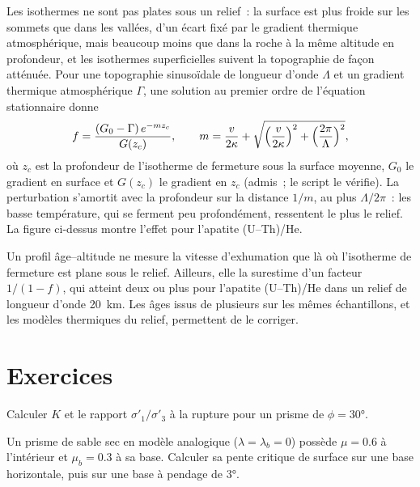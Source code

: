Les isothermes ne sont pas plates sous un relief~: la surface est plus froide sur les sommets
que dans les vallées, d'un écart fixé par le gradient thermique atmosphérique, mais beaucoup moins que
dans la roche à la même altitude en profondeur, et les isothermes superficielles
suivent la topographie de façon atténuée. Pour une topographie sinusoïdale de
longueur d'onde $\Lambda$ et un gradient thermique atmosphérique $\Gamma$, une solution au premier ordre de l'équation
stationnaire donne
\[
  f = \frac{(G_0 - \Gamma)\,e^{-mz_c}}{G(z_c)},\qquad
  m = \frac{v}{2\kappa} + \sqrt{\Bigl(\frac{v}{2\kappa}\Bigr)^2 +
  \Bigl(\frac{2\pi}{\Lambda}\Bigr)^2},
\]
où $z_c$ est la profondeur de l'isotherme de fermeture sous la surface moyenne,
$G_0$ le gradient en surface et $G(z_c)$ le gradient en $z_c$ (admis~;
le script le vérifie). La perturbation s'amortit avec la profondeur sur
la distance $1/m$, au plus $\Lambda/2\pi$~: les  basse température,
qui se ferment peu profondément, ressentent le plus le relief. La figure ci-dessus montre l'effet
pour l'apatite (U--Th)/He.

Un profil âge--altitude ne mesure la vitesse d'exhumation que là où
l'isotherme de fermeture est plane sous le relief. Ailleurs, elle la surestime d'un facteur $1/(1 - f)$, qui atteint
deux ou plus pour l'apatite (U--Th)/He dans un relief de longueur d'onde \qty{20}{km}.
Les âges issus de plusieurs  sur les mêmes échantillons, et les modèles
thermiques du relief, permettent de le corriger.

\section{Exercices}

\begin{exercise}[$\star$]\label{exo:b3:orogenic-wedges:1}
Calculer $K$ et le rapport $\sigma'_1/\sigma'_3$ à la rupture pour un prisme
de $\phi = \ang{30}$.
\end{exercise}

\begin{exercise}[$\star$]\label{exo:b3:orogenic-wedges:2}
Un prisme de sable sec en modèle analogique ($\lambda = \lambda_b = 0$) possède $\mu = 0.6$
à l'intérieur et $\mu_b = 0.3$ à sa base. Calculer sa pente critique de surface sur une
base horizontale, puis sur une base à pendage de \ang{3}.
\end{exercise}

